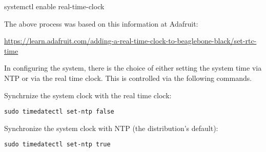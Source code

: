 systemctl enable real-time-clock

The above process was based on this information at Adafruit:

\url{https://learn.adafruit.com/adding-a-real-time-clock-to-beaglebone-black/set-rtc-time}

In configuring the system, there is the choice of either setting the system time via NTP or via the real time clock.  This is controlled via the following commands.

Synchrnize the system clock with the real time clock:

\begin{verbatim}
sudo timedatectl set-ntp false
\end{verbatim}

Synchronize the system clock with NTP (the distribution's default):

\begin{verbatim}
sudo timedatectl set-ntp true
\end{verbatim}


